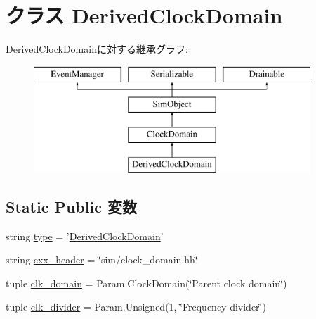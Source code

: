 \hypertarget{classClockDomain_1_1DerivedClockDomain}{
\section{クラス DerivedClockDomain}
\label{classClockDomain_1_1DerivedClockDomain}
}
DerivedClockDomainに対する継承グラフ:\begin{figure}[H]
\begin{center}
\leavevmode
\includegraphics[height=4cm]{classClockDomain_1_1DerivedClockDomain}
\end{center}
\end{figure}
\subsection*{Static Public 変数}
\begin{DoxyCompactItemize}
\item 
string \hyperlink{classClockDomain_1_1DerivedClockDomain_acce15679d830831b0bbe8ebc2a60b2ca}{type} = '\hyperlink{classClockDomain_1_1DerivedClockDomain}{DerivedClockDomain}'
\item 
string \hyperlink{classClockDomain_1_1DerivedClockDomain_a17da7064bc5c518791f0c891eff05fda}{cxx\_\-header} = \char`\"{}sim/clock\_\-domain.hh\char`\"{}
\item 
tuple \hyperlink{classClockDomain_1_1DerivedClockDomain_a596968ab1b20165f058769abb6d2f6ca}{clk\_\-domain} = Param.ClockDomain(\char`\"{}Parent clock domain\char`\"{})
\item 
tuple \hyperlink{classClockDomain_1_1DerivedClockDomain_a445eebf45c5ef75734fd17ddcaf32bc2}{clk\_\-divider} = Param.Unsigned(1, \char`\"{}Frequency divider\char`\"{})
\end{DoxyCompactItemize}


